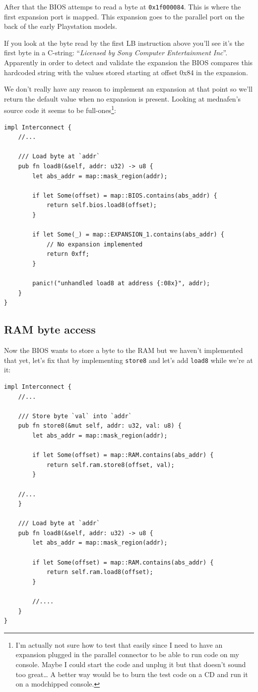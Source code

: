 \documentclass[a4paper]{article}
\newcommand{\code}[1] {\texttt{#1}}
\begin{document}
After that the BIOS attemps to read a byte at \code{0x1f000084}. This
is where the first expansion port is mapped. This expansion goes to
the parallel port on the back of the early Playstation models.

If you look at the byte read by the first LB instruction above you'll
see it's the first byte in a C-string: ``\textit{Licensed by Sony
  Computer Entertainment Inc}''. Apparently in order to detect and
validate the expansion the BIOS compares this hardcoded string with
the values stored starting at offset 0x84 in the expansion.

We don't really have any reason to implement an expansion at that
point so we'll return the default value when no expansion is
present. Looking at mednafen's source code it seems to be
full-ones\footnote{I'm actually not sure how to test that easily since
  I need to have an expansion plugged in the parallel connector to be
  able to run code on my console. Maybe I could start the code and
  unplug it but that doesn't sound too great\dots{} A better way
  would be to burn the test code on a CD and run it on a modchipped
  console.}:

\begin{lstlisting}
impl Interconnect {
    //...

    /// Load byte at `addr`
    pub fn load8(&self, addr: u32) -> u8 {
        let abs_addr = map::mask_region(addr);

        if let Some(offset) = map::BIOS.contains(abs_addr) {
            return self.bios.load8(offset);
        }

        if let Some(_) = map::EXPANSION_1.contains(abs_addr) {
            // No expansion implemented
            return 0xff;
        }

        panic!("unhandled load8 at address {:08x}", addr);
    }
}
\end{lstlisting}

\subsection{RAM byte access}

Now the BIOS wants to store a byte to the RAM but we haven't
implemented that yet, let's fix that by implementing \code{store8} and
let's add \code{load8} while we're at it:

\begin{lstlisting}
impl Interconnect {
    //...

    /// Store byte `val` into `addr`
    pub fn store8(&mut self, addr: u32, val: u8) {
        let abs_addr = map::mask_region(addr);

        if let Some(offset) = map::RAM.contains(abs_addr) {
            return self.ram.store8(offset, val);
        }

	//...
    }

    /// Load byte at `addr`
    pub fn load8(&self, addr: u32) -> u8 {
        let abs_addr = map::mask_region(addr);

        if let Some(offset) = map::RAM.contains(abs_addr) {
            return self.ram.load8(offset);
        }

        //....
    }
}
\end{lstlisting}
\end{document}
